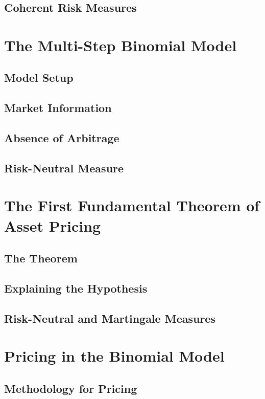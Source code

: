 \documentclass{beamer}
\numberwithin{equation}{section}
\begin{document}
\begin{frame}\frametitle{{\normalsize \secname} \\ {\large \subsecname}}
\end{frame}

\subsection{Coherent Risk Measures}

\section{The Multi-Step Binomial Model}
\subsection{Model Setup}
\subsection{Market Information}
\subsection{Absence of Arbitrage}
\subsection{Risk-Neutral Measure}

\section{The First Fundamental Theorem of Asset Pricing}
\subsection{The Theorem}
\subsection{Explaining the Hypothesis}
\subsection{Risk-Neutral and Martingale Measures}

\section{Pricing in the Binomial Model}
\subsection{Methodology for Pricing}
\end{document}
